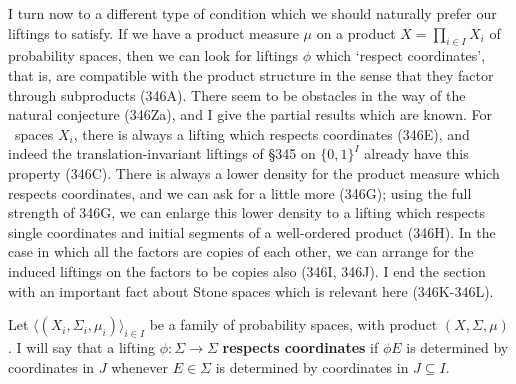 
\def\undtheta{\underline{\theta}}
\def\undphi{{\underline{\phi}}}
\def\undpsi{\underline{\psi}}
\def\upr{\mathop{\text{upr}}}
\def\tmputp{\underline{\tilde\phi}}

\def\chaptername{Liftings}
\def\sectionname{Consistent liftings}


I turn now to a different type of condition
which we should naturally prefer our liftings to satisfy.   If
we have a product measure $\mu$ on a product $X=\prod_{i\in I}X_i$ of
probability spaces, then we can look for liftings $\phi$ which `respect
coordinates', that is, are
compatible with the product structure in the sense that they factor
through subproducts (346A).   There seem to be obstacles in the way of
the natural conjecture (346Za), and I give the partial results which are
known.   For \Mth\ spaces $X_i$, there is always a
lifting which respects coordinates (346E), and indeed the
translation-invariant liftings of \S345
on $\{0,1\}^I$ already have this property (346C).   There is always a
lower density for the product measure
which respects coordinates, and we can ask
for a little more (346G);  using the full strength of 346G, we can
enlarge this lower density to a lifting which respects single
coordinates and initial segments of a well-ordered product (346H).   In
the case in which all the factors are copies of each other, we can
arrange for the induced liftings on the factors to be copies also (346I,
346J).   I end the section with an important fact about
Stone spaces which is relevant here (346K-346L).

 Let
$\langle(X_i,\Sigma_i,\mu_i)\rangle_{i\in I}$ be a family of
probability spaces, with product $(X,\Sigma,\mu)$.   I will say that
a lifting $\phi:\Sigma\to\Sigma$ {\bf respects coordinates} if $\phi E$
is determined by coordinates in $J$ whenever $E\in\Sigma$ is determined
by coordinates in $J\subseteq I$.


